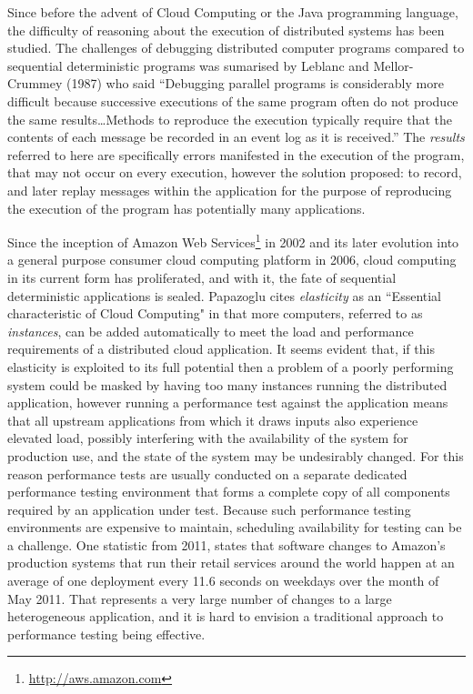 \documentclass[]{final_report}
\begin{document}
Since before the advent of Cloud Computing or the Java programming language, the difficulty of reasoning about the execution of distributed systems has been studied. The challenges of debugging distributed computer programs compared to sequential deterministic programs was sumarised by Leblanc and Mellor-Crummey (1987)\cite{leblanc:1987} who said ``Debugging parallel programs is considerably more difficult because successive executions of the same program often do not produce the same results\ldots{}Methods to reproduce the execution typically require that the contents of each message be recorded in an event log as it is received.'' The \textit{results} referred to here are specifically errors manifested in the execution of the program, that may not occur on every execution, however the solution proposed: to record, and later replay messages within the application for the purpose of reproducing the execution of the program has potentially many applications.

Since the inception of Amazon Web Services\footnote{\url{http://aws.amazon.com}} in 2002 and its later evolution into a general purpose consumer cloud computing platform in 2006,\cite{pallis:2010} cloud computing in its current form has proliferated, and with it, the fate of sequential deterministic applications is sealed. Papazoglu \cite{papazoglou:2008} cites \textit{elasticity} as an ``Essential characteristic of Cloud Computing" in that more computers, referred to as \textit{instances}, can be added automatically to meet the load and performance requirements of a distributed cloud application. It seems evident that, if this elasticity is exploited to its full potential then a problem of a poorly performing system could be masked by having too many instances running the distributed application, however running a performance test against the application means that all upstream applications from which it draws inputs also experience elevated load, possibly interfering with the availability of the system for production use, and the state of the system may be undesirably changed. For this reason performance tests are usually conducted on a separate dedicated performance testing environment that forms a complete copy of all components required by an application under test. Because such performance testing environments are expensive to maintain, scheduling availability for testing can be a challenge. One statistic from 2011,\cite{jenkins:2011} states that software changes to Amazon's production systems that run their retail services around the world happen at an average of one deployment every 11.6 seconds on weekdays over the month of May 2011. That represents a very large number of changes to a large heterogeneous application, and it is hard to envision a traditional approach to performance testing being effective.
\end{document}
